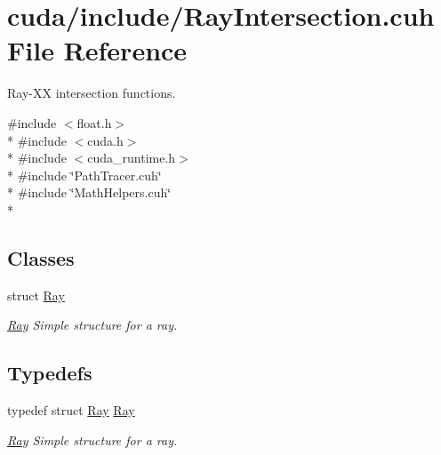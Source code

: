 \hypertarget{RayIntersection_8cuh}{\section{cuda/include/\-Ray\-Intersection.cuh File Reference}
\label{RayIntersection_8cuh}
}


Ray-\/\-X\-X intersection functions.  


{\ttfamily \#include $<$float.\-h$>$}\\*
{\ttfamily \#include $<$cuda.\-h$>$}\\*
{\ttfamily \#include $<$cuda\-\_\-runtime.\-h$>$}\\*
{\ttfamily \#include \char`\"{}Path\-Tracer.\-cuh\char`\"{}}\\*
{\ttfamily \#include \char`\"{}Math\-Helpers.\-cuh\char`\"{}}\\*
\subsection*{Classes}
\begin{DoxyCompactItemize}
\item 
struct \hyperlink{structRay}{Ray}
\begin{DoxyCompactList}\small\item\em \hyperlink{structRay}{Ray} Simple structure for a ray. \end{DoxyCompactList}\end{DoxyCompactItemize}
\subsection*{Typedefs}
\begin{DoxyCompactItemize}
\item 
\hypertarget{RayIntersection_8cuh_a4fc512e3e9c530910caef2d9d9d1bd18}{typedef struct \hyperlink{structRay}{Ray} \hyperlink{RayIntersection_8cuh_a4fc512e3e9c530910caef2d9d9d1bd18}{Ray}}\label{RayIntersection_8cuh_a4fc512e3e9c530910caef2d9d9d1bd18}

\begin{DoxyCompactList}\small\item\em \hyperlink{structRay}{Ray} Simple structure for a ray. \end{DoxyCompactList}\end{DoxyCompactItemize}

